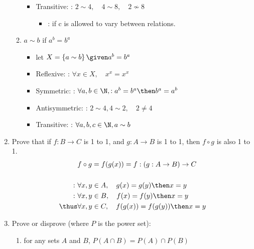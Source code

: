 \documentclass[basic, header]{nosvagor-notes}
\begin{document}
\begin{enumerate}[itemsep=5em]
\begin{enumerate}[itemsep=2.5em]
\begin{itemize}
          \item Transitive: : \(2 \sim 4, \quad 4 \sim 8, \quad 2 \nsim 8 \)
            \begin{itemize}
              \item {}: if c is allowed to vary between relations.
            \end{itemize}

        \end{itemize}

      \item $a \sim b$ if $a^b = b^a$
        \begin{itemize}
          \item let \(X = \left\{ a\sim b \right\} \given a^b = b^a\)
          \item Reflexive: : \(\forall x \in X, \quad x^x = x^x\)
          \item Symmetric: : \(\forall a,b \in \N, : a^b = b^a \then b^a = a^b\)
          \item Antisymmetric: : \(2 \sim 4, 4\sim 2, \quad 2\neq 4\)
          \item Transitive: : \(\forall a,b,c \in \N, a \sim b \)
        \end{itemize}

    \end{enumerate}

  \newpage %

    \item Prove that if $f : B \to C$ is 1 to 1, and $g : A \to B$ is 1 to 1,
      then $f \circ g$ is also 1 to 1.
        \begin{align*}
          & f \circ g = f(g(x)) = f: (g : A \to B ) \to C \\\\
          : ~   & \forall x, y \in A, \quad g(x) = g(y) \then x = y \\
          : ~   & \forall x, y \in B, \quad f(x) = f(y) \then x = y \\
          \thus & \forall x, y \in C, \quad f(g(x)) = f(g(y)) \then x = y
        \end{align*}

    \item Prove or disprove (where \(P\) is the power set):
      \begin{enumerate}
        \item for any sets $A$ and $B$, $P(A\cap B) = P(A) \cap P(B)$


\end{enumerate}
\end{enumerate}
\end{document}
